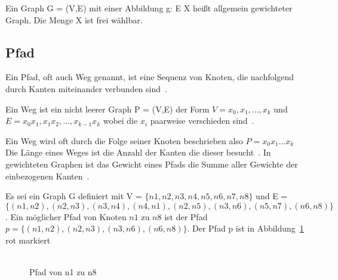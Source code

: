 \begin{definition}
    Ein Graph G = (V,E) mit einer Abbildung g: E \textrightarrow X heißt allgemein gewichteter Graph.
    Die Menge X ist frei wählbar.
    \label{allgemeingewichtetergraph}
\end{definition}

\subsection{Pfad}

Ein Pfad, oft auch Weg genannt, ist eine Sequenz von Knoten, die nachfolgend durch Kanten miteinander verbunden sind~\cite[vgl. S. 7 0.3]{graphentheorie}.

\begin{definition}
    Ein Weg ist ein nicht leerer Graph P = (V,E) der Form $V = {x_{0}, x_{1}, ..., x_{k}}$ und $E = {x_{0}x_{1}, x_{1}x_{2}, \ldots, x_{k-1}x_{k}}$ wobei die $x_{i}$
    paarweise verschieden sind~\cite[vgl. S. 7]{graphentheorie}.
\end{definition}

Ein Weg wird oft durch die Folge seiner Knoten beschrieben also $P=x_{0} x_{1} \ldots x_{k}$ \cite[vgl. S.7]{graphentheorie}
Die Länge eines Weges ist die Anzahl der Kanten die dieser besucht~\cite[vgl. S. 7]{graphentheorie}.
In gewichteten Graphen ist das Gewicht eines Pfads die Summe aller Gewichte der einbezogenen Kanten~\cite[vgl. 7.2 kürzeste Wege]{graphentheorie3}.

\begin{example}
    Es sei ein Graph G definiert mit V = $\{n1,n2,n3,n4,n5,n6,n7,n8\}$ und E = $\{(n1,n2),(n2,n3),(n3,n4),(n4,n1),(n2,n5),(n3,n6),(n5,n7),(n6,n8)\}$.
    Ein möglicher Pfad von Knoten $n1$ zu $n8$ ist der Pfad $p = \{(n1, n2), (n2, n3), (n3, n6), (n6, n8)\}$.
    Der Pfad p ist in Abbildung~\ref{pfadbsp} rot markiert \\ \\
\end{example}

\begin{figure}[H]
    \begin{center}
    \end{center}
    \caption{Pfad von n1 zu n8}
    \label{pfadbsp}
\end{figure}

